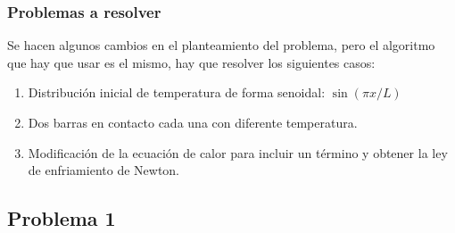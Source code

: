 \documentclass[12pt]{beamer}
\begin{document}
\begin{frame}
\frametitle{Problemas a resolver}
Se hacen algunos cambios en el planteamiento del problema, pero el algoritmo que hay que usar es el mismo, hay que resolver los siguientes casos:
\begin{enumerate}[<+->]
\item Distribución inicial de temperatura de forma senoidal: $\sin( \pi x / L)$
\item Dos barras en contacto cada una con diferente temperatura.
\item Modificación de la ecuación de calor para incluir un término y obtener la ley de enfriamiento de Newton.
\end{enumerate}
\end{frame}

\subsection{Problema 1}
\end{document}
